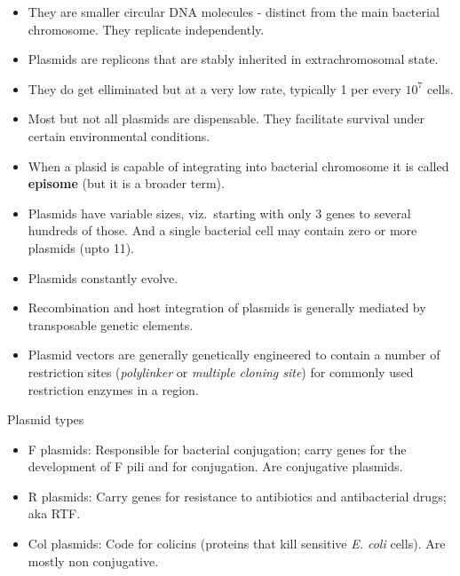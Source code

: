 \documentclass[11pt,dvipsnames,ignorenonframetext,aspectratio=169]{beamer}
\providecommand{\tightlist}{%
  \setlength{\itemsep}{0pt}\setlength{\parskip}{0pt}}
\begin{document}
\begin{frame}{}
\protect\hypertarget{section-17}{}
\begin{itemize}
\tightlist
\item
  They are smaller circular DNA molecules - distinct from the main
  bacterial chromosome. They replicate independently.
\item
  Plasmids are replicons that are stably inherited in extrachromosomal
  state.
\item
  They do get elliminated but at a very low rate, typically 1 per every
  \(10^{7}\) cells.
\item
  Most but not all plasmids are dispensable. They facilitate survival
  under certain environmental conditions.
\item
  When a plasid is capable of integrating into bacterial chromosome it
  is called \textbf{episome} (but it is a broader term).
\item
  Plasmids have variable sizes, viz.~starting with only 3 genes to
  several hundreds of those. And a single bacterial cell may contain
  zero or more plasmids (upto 11).
\item
  Plasmids constantly evolve.
\item
  Recombination and host integration of plasmids is generally mediated
  by transposable genetic elements.
\item
  Plasmid vectors are generally genetically engineered to contain a
  number of restriction sites (\emph{polylinker} or \emph{multiple
  cloning site}) for commonly used restriction enzymes in a region.
\end{itemize}
\end{frame}

\begin{frame}{Plasmid types}
\protect\hypertarget{plasmid-types}{}
\begin{itemize}
\tightlist
\item
  F plasmids: Responsible for bacterial conjugation; carry genes for the
  development of F pili and for conjugation. Are conjugative plasmids.
\item
  R plasmids: Carry genes for resistance to antibiotics and
  antibacterial drugs; aka RTF.
\item
  Col plasmids: Code for colicins (proteins that kill sensitive \emph{E.
  coli} cells). Are mostly non conjugative.
\end{itemize}
\end{frame}
\end{document}

